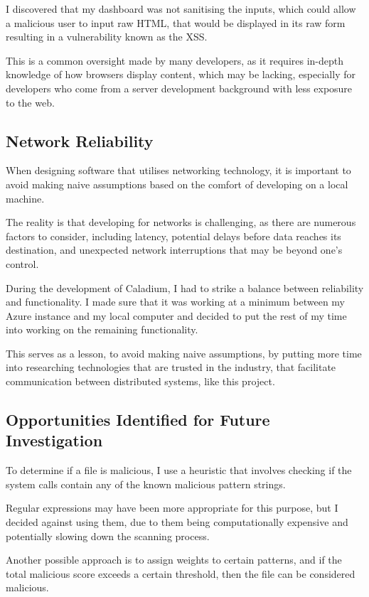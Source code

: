 I discovered that my dashboard was not sanitising the inputs,
which could allow a malicious user to input raw HTML,
that would be displayed in its raw form
resulting in a vulnerability known as the XSS.

This is a common oversight made by many developers,
as it requires in-depth knowledge of how browsers display content,
which may be lacking, especially for developers who come
from a server development background with less exposure to the web.

\subsection{Network Reliability}
When designing software that utilises networking technology,
it is important to avoid making naive assumptions based
on the comfort of developing on a local machine.

The reality is that developing for networks is challenging,
as there are numerous factors to consider,
including latency, potential delays before data reaches its destination,
and unexpected network interruptions that may be beyond one's control.

During the development of Caladium,
I had to strike a balance between reliability and functionality.
I made sure that it was working at a minimum between
my Azure instance and my local computer and decided to
put the rest of my time into working on the remaining functionality.

This serves as a lesson, to avoid making naive assumptions,
by putting more time into researching technologies
that are trusted in the industry, that facilitate communication
between distributed systems, like this project.

\subsection{Opportunities Identified for Future Investigation}
To determine if a file is malicious,
I use a heuristic that involves checking if the system calls
contain any of the known malicious pattern strings.

Regular expressions may have been more appropriate for this purpose,
but I decided against using them, due to them being computationally
expensive and potentially slowing down the scanning process.

Another possible approach is to assign weights to certain patterns,
and if the total malicious score exceeds a certain threshold,
then the file can be considered malicious.

